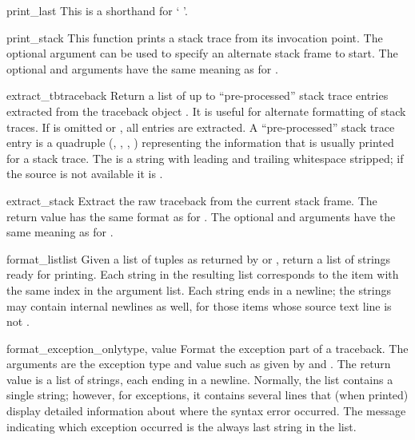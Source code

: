 \begin{funcdesc}{print_last}{}
This is a shorthand for `
  \code{,}
\code{)}'.
\end{funcdesc}

\begin{funcdesc}{print_stack}{}
This function prints a stack trace from its invocation point.  The
optional  argument can be used to specify an alternate stack
frame to start.  The optional  and  arguments have the
same meaning as for .
\end{funcdesc}

\begin{funcdesc}{extract_tb}{traceback}
Return a list of up to  ``pre-processed'' stack trace
entries extracted from the traceback object .  It is
useful for alternate formatting of stack traces.  If  is
omitted or , all entries are extracted.  A
``pre-processed'' stack trace entry is a quadruple (,
, , ) representing
the information that is usually printed for a stack trace.  The
 is a string with leading and trailing whitespace
stripped; if the source is not available it is .
\end{funcdesc}

\begin{funcdesc}{extract_stack}{}
Extract the raw traceback from the current stack frame.  The return
value has the same format as for .  The
optional  and  arguments have the same meaning as
for .
\end{funcdesc}

\begin{funcdesc}{format_list}{list}
Given a list of tuples as returned by  or
, return a list of strings ready for
printing.  Each string in the resulting list corresponds to the item
with the same index in the argument list.  Each string ends in a
newline; the strings may contain internal newlines as well, for those
items whose source text line is not .
\end{funcdesc}

\begin{funcdesc}{format_exception_only}{type, value}
Format the exception part of a traceback.  The arguments are the
exception type and value such as given by  and
.  The return value is a list of strings, each
ending in a newline.  Normally, the list contains a single string;
however, for  exceptions, it contains several lines
that (when printed) display detailed information about where the
syntax error occurred.  The message indicating which exception
occurred is the always last string in the list.
\end{funcdesc}

